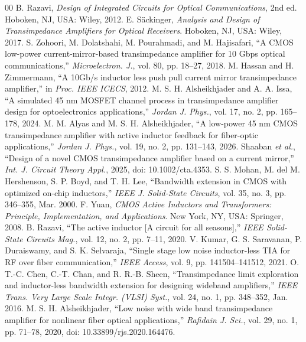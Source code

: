 \documentclass[conference]{IEEEtran}
\begin{document}
\begin{thebibliography}{00}
 B. Razavi, \emph{Design of Integrated Circuits for Optical Communications}, 2nd ed. Hoboken, NJ, USA: Wiley, 2012.
 E. S\"ackinger, \emph{Analysis and Design of Transimpedance Amplifiers for Optical Receivers}. Hoboken, NJ, USA: Wiley, 2017.
 S. Zohoori, M. Dolatshahi, M. Pourahmadi, and M. Hajisafari, ``A CMOS low-power current-mirror-based transimpedance amplifier for 10 Gbps optical communications,'' \emph{Microelectron. J.}, vol. 80, pp. 18--27, 2018.
 M. Hassan and H. Zimmermann, ``A 10Gb/s inductor less push pull current mirror transimpedance amplifier,'' in \emph{Proc. IEEE ICECS}, 2012.
 M. S. H. Alsheikhjader and A. A. Issa, ``A simulated 45 nm MOSFET channel process in transimpedance amplifier design for optoelectronics applications,'' \emph{Jordan J. Phys.}, vol. 17, no. 2, pp. 165--178, 2024.
 M. M. Alyas and M. S. H. Alsheikhjader, ``A low-power 45 nm CMOS transimpedance amplifier with active inductor feedback for fiber-optic applications,'' \emph{Jordan J. Phys.}, vol. 19, no. 2, pp. 131--143, 2026.
 Shaaban \emph{et al.}, ``Design of a novel CMOS transimpedance amplifier based on a current mirror,'' \emph{Int. J. Circuit Theory Appl.}, 2025, doi: 10.1002/cta.4353.
 S. S. Mohan, M. del M. Hershenson, S. P. Boyd, and T. H. Lee, ``Bandwidth extension in CMOS with optimized on-chip inductors,'' \emph{IEEE J. Solid-State Circuits}, vol. 35, no. 3, pp. 346--355, Mar. 2000.
 F. Yuan, \emph{CMOS Active Inductors and Transformers: Principle, Implementation, and Applications}. New York, NY, USA: Springer, 2008.
 B. Razavi, ``The active inductor [A circuit for all seasons],'' \emph{IEEE Solid-State Circuits Mag.}, vol. 12, no. 2, pp. 7--11, 2020.
 V. Kumar, G. S. Saravanan, P. Duraiswamy, and S. K. Selvaraja, ``Single stage low noise inductor-less TIA for RF over fiber communication,'' \emph{IEEE Access}, vol. 9, pp. 141504--141512, 2021.
 O. T.-C. Chen, C.-T. Chan, and R. R.-B. Sheen, ``Transimpedance limit exploration and inductor-less bandwidth extension for designing wideband amplifiers,'' \emph{IEEE Trans. Very Large Scale Integr. (VLSI) Syst.}, vol. 24, no. 1, pp. 348--352, Jan. 2016.
 M. S. H. Alsheikhjader, ``Low noise with wide band transimpedance amplifier for nonlinear fiber optical applications,'' \emph{Rafidain J. Sci.}, vol. 29, no. 1, pp. 71--78, 2020, doi: 10.33899/rjs.2020.164476.

\end{thebibliography}
\end{document}
